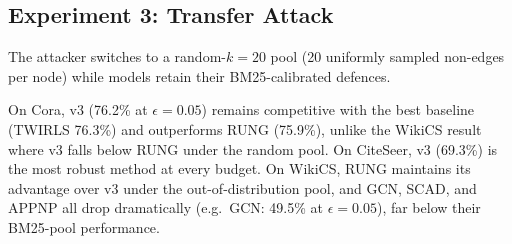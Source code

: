 \documentclass{article}
\begin{document}
\subsection{Experiment 3: Transfer Attack}
\label{sec:exp3}

The attacker switches to a random-$k{=}20$ pool (20 uniformly sampled
non-edges per node) while models retain their BM25-calibrated defences.

On Cora, v3 (76.2\% at $\epsilon{=}0.05$) remains competitive with the
best baseline (TWIRLS 76.3\%) and outperforms RUNG (75.9\%), unlike the
WikiCS result where v3 falls below RUNG under the random pool. On CiteSeer,
v3 (69.3\%) is the most robust method at every budget. On WikiCS, RUNG
maintains its advantage over v3 under the out-of-distribution pool, and
GCN, SCAD, and APPNP all drop dramatically (e.g.\ GCN: 49.5\% at
$\epsilon{=}0.05$), far below their BM25-pool performance.
\end{document}
